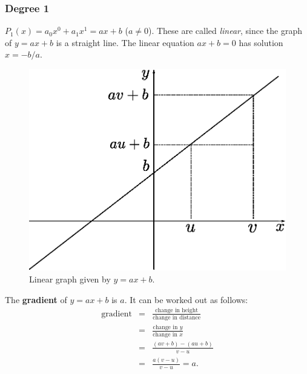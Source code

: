 \subsubsection{Degree 1} $P_1(x)=a_0x^0+a_1x^1 = ax+b$ ($a\ne 0$). These are called {\it linear}, since the graph of $y=ax+b$ is a straight line. The linear equation $ax+b=0$ has solution $x=-b/a$.\\
\begin{figure}[H]
\centering
\includegraphics[scale=0.65]{img/linear-graph}
\captionstyle{\centering\it}
\caption{Linear graph given by $y=ax+b$.}
\label{fig:linear-graph}
\end{figure}

The \textbf{gradient} of $y=ax+b$ is $a$. It can be worked out as follows:
\begin{eqnarray}
\text{gradient} &=& \frac{\text{change in height}}{\text{change in distance}} \nonumber \\
&=& \frac{\text{change in }y}{\text{change in }x} \nonumber \\
&=& \frac{(av+b)-(au+b)}{v-u} \nonumber \\
&=& \frac{a(v-u)}{v-u} = a.
\end{eqnarray}

